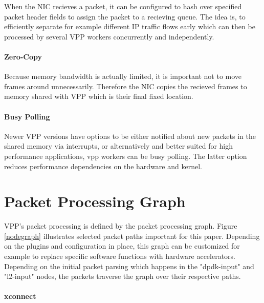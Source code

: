 When the NIC recieves a packet, it can be configured to hash over
specified packet header fields to assign the packet to a recieving
queue. The idea is, to efficiently separate for example different IP
traffic flows early which can then be processed by several VPP workers
concurrently and independently. \cite{linguaglossa2017high}

\paragraph{Zero-Copy}

Because memory bandwidth is actually limited, it is important not to
move frames around unnecessarily. Therefore the NIC copies the
recieved frames to memory shared with VPP which is their final fixed
location. \cite{linguaglossa2017high}

\paragraph{Busy Polling}

Newer VPP versions have options to be either notified about new
packets in the shared memory via interrupts, or alternatively and
better suited for high performance applications, vpp workers can be
busy polling. The latter option reduces performance dependencies on
the hardware and kernel. \cite{vppdocs:rxmodes}


\section{Packet Processing Graph}


VPP's packet processing is defined by the packet processing graph.
Figure \ref{nodegraph} illustrates selected packet paths important for
this paper. Depending on the plugins and configuration in place, this
graph can be customized for example to replace specific software
functions with hardware accelerators. Depending on the initial packet
parsing which happens in the "dpdk-input" and "l2-input" nodes, the
packets traverse the graph over their respective paths.

\paragraph{xconnect}

